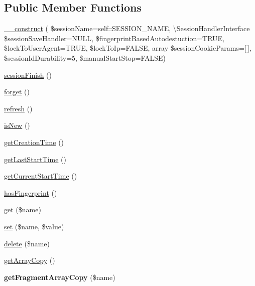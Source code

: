 \subsection*{Public Member Functions}
\begin{DoxyCompactItemize}
\item 
\mbox{\hyperlink{class_pes_1_1_session_1_1_session_status_handler_a77699dabe8607f31e083c19fb1063a15}{\+\_\+\+\_\+construct}} ( \$session\+Name=self\+::\+S\+E\+S\+S\+I\+O\+N\+\_\+\+N\+A\+ME, \textbackslash{}Session\+Handler\+Interface \$session\+Save\+Handler=N\+U\+LL, \$fingerprint\+Based\+Autodestuction=T\+R\+UE, \$lock\+To\+User\+Agent=T\+R\+UE, \$lock\+To\+Ip=F\+A\+L\+SE, array \$session\+Cookie\+Params=\mbox{[}$\,$\mbox{]}, \$session\+Id\+Durability=5, \$manual\+Start\+Stop=F\+A\+L\+SE)
\item 
\mbox{\hyperlink{class_pes_1_1_session_1_1_session_status_handler_a7a2d485c1a1c3c6454a6ca583beefee6}{session\+Finish}} ()
\item 
\mbox{\hyperlink{class_pes_1_1_session_1_1_session_status_handler_a5fd46320a3fc88f4322cbb025eab7cba}{forget}} ()
\item 
\mbox{\hyperlink{class_pes_1_1_session_1_1_session_status_handler_a2aff0844db6d9b56e6ba96123e1dd11c}{refresh}} ()
\item 
\mbox{\hyperlink{class_pes_1_1_session_1_1_session_status_handler_ad5305cbf1b1f253e8bef4b2c478dacb0}{is\+New}} ()
\item 
\mbox{\hyperlink{class_pes_1_1_session_1_1_session_status_handler_a8af92ba90a86c8c4abaf02cc314440f1}{get\+Creation\+Time}} ()
\item 
\mbox{\hyperlink{class_pes_1_1_session_1_1_session_status_handler_a0a413f841ff7f4681218eebe9acc847f}{get\+Last\+Start\+Time}} ()
\item 
\mbox{\hyperlink{class_pes_1_1_session_1_1_session_status_handler_a2ac1590473377275979c720110f5cfed}{get\+Current\+Start\+Time}} ()
\item 
\mbox{\hyperlink{class_pes_1_1_session_1_1_session_status_handler_aa053bd6719cc91c4fa951aa9266748aa}{has\+Fingerprint}} ()
\item 
\mbox{\hyperlink{class_pes_1_1_session_1_1_session_status_handler_af5ea6a083ddb07beb8a30dd32e309ceb}{get}} (\$name)
\item 
\mbox{\hyperlink{class_pes_1_1_session_1_1_session_status_handler_aa4c6a0b87c6e47fa6f863eedb300e707}{set}} (\$name, \$value)
\item 
\mbox{\hyperlink{class_pes_1_1_session_1_1_session_status_handler_af7c3ea3150164bc92700134803f277be}{delete}} (\$name)
\item 
\mbox{\hyperlink{class_pes_1_1_session_1_1_session_status_handler_a9c9bae4e44ee76a926fa7ecdc49dd8b5}{get\+Array\+Copy}} ()
\item 
\mbox{\label{class_pes_1_1_session_1_1_session_status_handler_a74471f9981ad06ab0eb6be1acf0c9e71}} 
{\bfseries get\+Fragment\+Array\+Copy} (\$name)
\end{DoxyCompactItemize}
